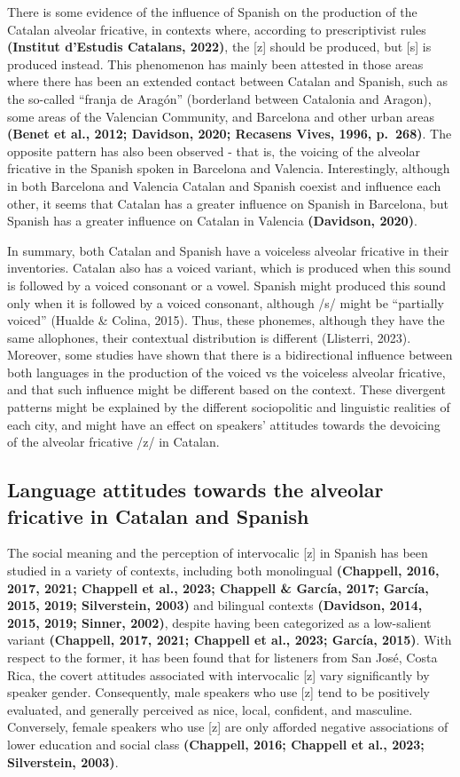 \documentclass[
  a4paper,
  11pt,
  twocolumn]{article}
\begin{document}
There is some evidence of the influence of Spanish on the production of
the Catalan alveolar fricative, in contexts where, according to
prescriptivist rules \textbf{(Institut d'Estudis Catalans, 2022)}, the
{[}z{]} should be produced, but {[}s{]} is produced instead. This
phenomenon has mainly been attested in those areas where there has been
an extended contact between Catalan and Spanish, such as the so-called
``franja de Aragón'' (borderland between Catalonia and Aragon), some
areas of the Valencian Community, and Barcelona and other urban areas
\textbf{(Benet et al., 2012; Davidson, 2020; Recasens Vives, 1996,
p.~268)}. The opposite pattern has also been observed - that is, the
voicing of the alveolar fricative in the Spanish spoken in Barcelona and
Valencia. Interestingly, although in both Barcelona and Valencia Catalan
and Spanish coexist and influence each other, it seems that Catalan has
a greater influence on Spanish in Barcelona, but Spanish has a greater
influence on Catalan in Valencia \textbf{(Davidson, 2020)}.

In summary, both Catalan and Spanish have a voiceless alveolar fricative
in their inventories. Catalan also has a voiced variant, which is
produced when this sound is followed by a voiced consonant or a vowel.
Spanish might produced this sound only when it is followed by a voiced
consonant, although /s/ might be ``partially voiced'' (Hualde \& Colina,
2015). Thus, these phonemes, although they have the same allophones,
their contextual distribution is different (Llisterri, 2023). Moreover,
some studies have shown that there is a bidirectional influence between
both languages in the production of the voiced vs the voiceless alveolar
fricative, and that such influence might be different based on the
context. These divergent patterns might be explained by the different
sociopolitic and linguistic realities of each city, and might have an
effect on speakers' attitudes towards the devoicing of the alveolar
fricative /z/ in Catalan.

\subsection{Language attitudes towards the alveolar fricative in Catalan and Spanish}

The social meaning and the perception of intervocalic {[}z{]} in Spanish
has been studied in a variety of contexts, including both monolingual
\textbf{(Chappell, 2016, 2017, 2021; Chappell et al., 2023; Chappell \&
García, 2017; García, 2015, 2019; Silverstein, 2003)} and bilingual
contexts \textbf{(Davidson, 2014, 2015, 2019; Sinner, 2002)}, despite
having been categorized as a low-salient variant \textbf{(Chappell,
2017, 2021; Chappell et al., 2023; García, 2015)}. With respect to the
former, it has been found that for listeners from San José, Costa Rica,
the covert attitudes associated with intervocalic {[}z{]} vary
significantly by speaker gender. Consequently, male speakers who use
{[}z{]} tend to be positively evaluated, and generally perceived as
nice, local, confident, and masculine. Conversely, female speakers who
use {[}z{]} are only afforded negative associations of lower education
and social class \textbf{(Chappell, 2016; Chappell et al., 2023;
Silverstein, 2003)}.
\end{document}
